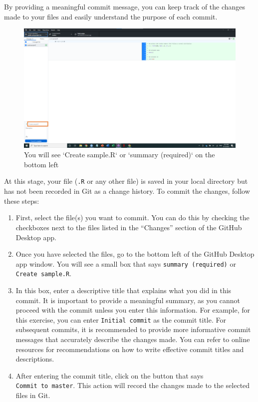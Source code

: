 \documentclass[
]{article}
\begin{document}
By providing a meaningful commit message, you can keep track of the changes made to your files and easily understand the purpose of each commit.

\begin{figure}

{\centering \includegraphics[width=61.11in]{image/git_image04} 

}

\caption{You will see `Create sample.R` or `summary (required)` on the bottom left}\label{fig:gitdesktop3}
\end{figure}

At this stage, your file (\texttt{.R} or any other file) is saved in your local directory but has not been recorded in Git as a change history. To commit the changes, follow these steps:

\begin{enumerate}
\def\labelenumi{\arabic{enumi}.}
\item
  First, select the file(s) you want to commit. You can do this by checking the checkboxes next to the files listed in the ``Changes'' section of the GitHub Desktop app.
\item
  Once you have selected the files, go to the bottom left of the GitHub Desktop app window. You will see a small box that says \texttt{summary\ (required)} or \texttt{Create\ sample.R}.
\item
  In this box, enter a descriptive title that explains what you did in this commit. It is important to provide a meaningful summary, as you cannot proceed with the commit unless you enter this information. For example, for this exercise, you can enter \texttt{Initial\ commit} as the commit title. For subsequent commits, it is recommended to provide more informative commit messages that accurately describe the changes made. You can refer to online resources for recommendations on how to write effective commit titles and descriptions.
\item
  After entering the commit title, click on the button that says \texttt{Commit\ to\ master}. This action will record the changes made to the selected files in Git.
\end{enumerate}
\end{document}
